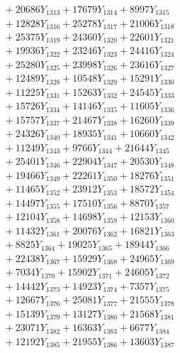 \documentclass[a4paper,10pt]{article}
\begin{document}
{\begin{align}
&\;  + 20686 Y_{1313} + 17679 Y_{1314} + 8997 Y_{1315} \\[0.3ex]
&\;  + 12828 Y_{1316} + 25278 Y_{1317} + 21006 Y_{1318} \\[0.5ex]\allowbreak
&\;  + 25375 Y_{1319} + 24360 Y_{1320} + 22601 Y_{1321} \\[0.3ex]
&\;  + 19936 Y_{1322} + 23246 Y_{1323} + 24416 Y_{1324} \\[0.3ex]
&\;  + 25280 Y_{1325} + 23998 Y_{1326} + 23616 Y_{1327} \\[0.3ex]
&\;  + 12489 Y_{1328} + 10548 Y_{1329} + 15291 Y_{1330} \\[0.3ex]
&\;  + 11225 Y_{1331} + 15263 Y_{1332} + 24545 Y_{1333} \\[0.3ex]
&\;  + 15726 Y_{1334} + 14146 Y_{1335} + 11605 Y_{1336} \\[0.3ex]
&\;  + 15757 Y_{1337} + 21467 Y_{1338} + 16260 Y_{1339} \\[0.3ex]
&\;  + 24326 Y_{1340} + 18935 Y_{1341} + 10660 Y_{1342} \\[0.3ex]
&\;  + 11249 Y_{1343} + 9766 Y_{1344} + 21644 Y_{1345} \\[0.3ex]
&\;  + 25401 Y_{1346} + 22904 Y_{1347} + 20530 Y_{1348} \\[0.5ex]\allowbreak
&\;  + 19466 Y_{1349} + 22261 Y_{1350} + 18276 Y_{1351} \\[0.3ex]
&\;  + 11465 Y_{1352} + 23912 Y_{1353} + 18572 Y_{1354} \\[0.3ex]
&\;  + 14497 Y_{1355} + 17510 Y_{1356} + 8870 Y_{1357} \\[0.3ex]
&\;  + 12104 Y_{1358} + 14698 Y_{1359} + 12153 Y_{1360} \\[0.3ex]
&\;  + 11432 Y_{1361} + 20076 Y_{1362} + 16821 Y_{1363} \\[0.3ex]
&\;  + 8825 Y_{1364} + 19025 Y_{1365} + 18944 Y_{1366} \\[0.3ex]
&\;  + 22438 Y_{1367} + 15929 Y_{1368} + 24965 Y_{1369} \\[0.3ex]
&\;  + 7034 Y_{1370} + 15902 Y_{1371} + 24605 Y_{1372} \\[0.3ex]
&\;  + 14442 Y_{1373} + 14923 Y_{1374} + 7357 Y_{1375} \\[0.3ex]
&\;  + 12667 Y_{1376} + 25081 Y_{1377} + 21555 Y_{1378} \\[0.5ex]\allowbreak
&\;  + 15139 Y_{1379} + 13127 Y_{1380} + 21568 Y_{1381} \\[0.3ex]
&\;  + 23071 Y_{1382} + 16363 Y_{1383} + 6677 Y_{1384} \\[0.3ex]
&\;  + 12192 Y_{1385} + 21955 Y_{1386} + 13603 Y_{1387} \\[0.3ex]

\end{align}}
\end{document}
